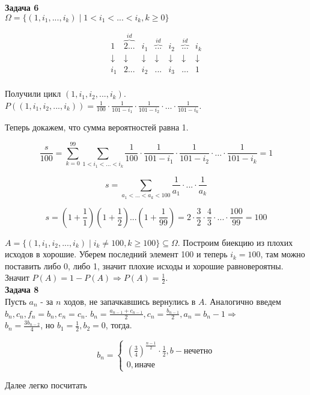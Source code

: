 \textbf{Задача 6}\\

$\Omega = \{(1, i_1, ..., i_k) \mid 1 < i_1 < ... < i_k, k \geq 0\}$

\begin{equation*}
    \begin{array}{ccccccc}
        1 & \overbrace{2 ...}^{id} & i_1 &\overbrace{...}^{id} & i_2 &\overbrace{...}^{id}&i_k\\
        \downarrow  & \downarrow &\downarrow & \downarrow & \downarrow& \downarrow & \downarrow\\
        i_1 & 2   ... & i_2 & ... & i_3 & ... & 1\\
    \end{array}
\end{equation*}

Получили цикл $(1, i_1, i_2, ..., i_k)$. $P((1, i_1, i_2, ..., i_k)) = \frac{1}{100} \cdot \frac{1}{101 - i_1} \cdot \frac{1}{101 - i_2} \cdot \dots \cdot \frac{1}{101 - i_k}$.

Теперь докажем, что сумма вероятностей равна 1.

\begin{equation*}
    \frac{s}{100} = \sum\limits_{k = 0}^{99} \sum\limits_{1 < i_1 <...<i_k} \frac{1}{100} \cdot \frac{1}{101 - i_1} \cdot \frac{1}{101 - i_2} \cdot \dots \cdot \frac{1}{101 - i_k} = 1
\end{equation*}

\begin{equation*}
    s = \sum\limits_{a_1 < ... < a_k < 100} \frac{1}{a_1} \cdot ... \cdot \frac{1}{a_k}
\end{equation*}

\begin{equation*}
    s = (1 + \frac{1}{1}) (1 + \frac{1}{2})...(1 + \frac{1}{99}) = 2 \cdot \frac{3}{2} \cdot \frac{4}{3} \cdot ... \cdot \frac{100}{99} = 100
\end{equation*}

$A = \{(1, i_1, i_2, ..., i_k) \mid i_k \neq 100, k \geq 100\} \subseteq \Omega$. Построим биекцию из плохих исходов в хорошие. Уберем последний элемент 100 и теперь
$i_k = 100$, там можно поставить либо 0, либо 1, значит плохие исходы и хорошие равновероятны. Значит $P(A) = 1 - P(A) \Rightarrow P(A) = \frac{1}{2}$.\\

\textbf{Задача 8}\\

Пусть $a_n$ - за $n$ ходов, не запачкавшись вернулись в $A$. Аналогично введем $b_n, c_n, f_n = b_n, e_n = c_n$.
$b_n = \frac{a_{n -1} + c_{n - 1}}{2}, c_n = \frac{b_{n - 1}}{2}, a_n = b_n - 1 \Rightarrow$\\

$b_n = \frac{3b_{n - 2}}{4}$, но $b_1 = \frac{1}{2}, b_2 = 0$, тогда.

\begin{equation*}
    b_n =
    \begin{cases}
        \left(\frac{3}{4}\right)^{\frac{n - 1}{2}} \cdot \frac{1}{2}, b - \text{нечетно}\\
        0, \text{иначе}
    \end{cases}
\end{equation*}

Далее легко посчитать